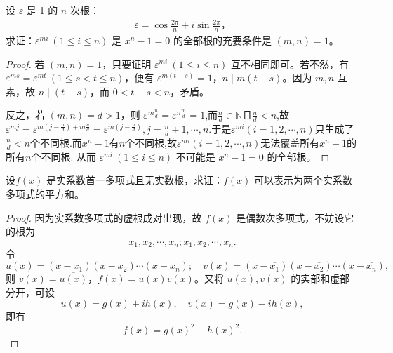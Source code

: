 \documentclass[../../main.tex]{subfiles}%
\begin{document}
\begin{example}
设 $\varepsilon$ 是 1 的 $n$ 次根：
\begin{align*}
\varepsilon = \cos \frac{2\pi}{n} + i \sin \frac{2\pi}{n}，
\end{align*}
求证：$\varepsilon^{mi} \ (1 \leqslant  i \leqslant  n)$ 是 $x^n - 1 = 0$ 的全部根的充要条件是 $(m, n) = 1$。
\end{example}
\begin{proof}
若 $(m, n) = 1$，只要证明 $\varepsilon^{mi} \ (1 \leqslant  i \leqslant  n)$ 互不相同即可。若不然，有 $\varepsilon^{ms} = \varepsilon^{mt} \ (1 \leqslant  s < t \leqslant  n)$，便有 $\varepsilon^{m(t-s)} = 1$，$n \mid m(t-s)$。因为 $m, n$ 互素，故 $n \mid (t-s)$，而 $0 < t-s < n$，矛盾。

反之，若 $(m, n) = d > 1$，则 $\varepsilon^{m \frac{n}{d}} = \varepsilon^{n \frac{m}{d}} = 1$,而$\frac{n}{d}\in \mathbb{N}$且$\frac{n}{d}<n$,故$\varepsilon ^{mj}=\varepsilon ^{m\left( j-\frac{n}{d} \right) +m\frac{n}{d}}=\varepsilon ^{m\left( j-\frac{n}{d} \right)},j=\frac{n}{d}+1,\cdots ,n.$于是$\varepsilon ^{mi}\left( i=1,2,\cdots ,n \right) $只生成了$\frac{n}{d}<n$个不同根.而$x^n-1$有$n$个不同根,故$\varepsilon ^{mi}\left( i=1,2,\cdots ,n \right)$无法覆盖所有$x^n-1$的所有$n$个不同根.
从而 $\varepsilon^{mi} \ (1 \leqslant  i \leqslant  n)$ 不可能是 $x^n - 1 = 0$ 的全部根。
\end{proof}

\begin{proposition}
设\( f(x) \) 是实系数首一多项式且无实数根，求证：\( f(x) \) 可以表示为两个实系数多项式的平方和。
\end{proposition}
\begin{proof}
因为实系数多项式的虚根成对出现，故 \( f(x) \) 是偶数次多项式，不妨设它的根为
\[
x_1, x_2, \cdots, x_n; \overline{x_1}, \overline{x_2}, \cdots, \overline{x_n}.
\]
令
\[
u(x) = (x - x_1)(x - x_2) \cdots (x - x_n); \quad v(x) = (x - \overline{x_1})(x - \overline{x_2}) \cdots (x - \overline{x_n}),
\]
则 \( v(x) = \overline{u(x)} \)，\( f(x) = u(x)v(x) \)。又将 \( u(x), v(x) \) 的实部和虚部分开，可设
\[
u(x) = g(x) + ih(x), \quad v(x) = g(x) - ih(x),
\]
即有
\[
f(x) = g(x)^2 + h(x)^2.
\]
\end{proof}
\end{document}
